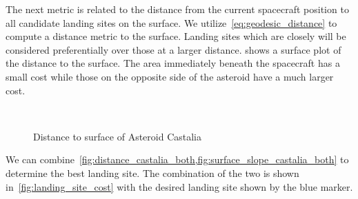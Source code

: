 The next metric is related to the distance from the current spacecraft position to all candidate landing sites on the surface.
We utilize~\cref{eq:geodesic_distance} to compute a distance metric to the surface.
Landing sites which are closely will be considered preferentially over those at a larger distance.
 shows a surface plot of the distance to the surface. 
The area immediately beneath the spacecraft has a small cost while those on the opposite side of the asteroid have a much larger cost.
\begin{figure}[htbp]
    \centering
    ~
    \caption{Distance to surface of Asteroid Castalia\label{fig:distance_castalia_both}}
\end{figure}
We can combine~\cref{fig:distance_castalia_both,fig:surface_slope_castalia_both} to determine the best landing site. 
The combination of the two is shown in~\cref{fig:landing_site_cost} with the desired landing site shown by the blue marker.
